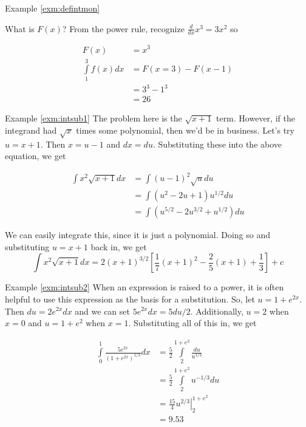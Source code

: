 \documentclass[]{book}
\theoremstyle{definition}
\theoremstyle{definition}
\theoremstyle{definition}
\theoremstyle{remark}
\begin{document}
Example \ref{exm:defintmon}

{}What is \(F(x)\)? From the power rule, recognize \(\frac{d}{dx}x^3 = 3x^2\) so

\begin{align*}
F(x) &= x^3\\
\int\limits_1^3 f(x) dx &= F(x = 3) - F(x  - 1)\\
&= 3^3 - 1^3\\
&=26
\end{align*}

Example \ref{exm:intsub1}
{}The problem here is the \(\sqrt{x+1}\) term. However, if the integrand had \(\sqrt{x}\) times some polynomial, then we'd be in business. Let's try \(u=x+1\). Then \(x=u-1\) and \(dx=du\). Substituting these into the above equation, we get

\begin{align*}
            \int x^2\sqrt{x+1}dx&= \int (u-1)^2\sqrt{u}du\\
            &= \int (u^2-2u+1)u^{1/2}du\\
            &= \int (u^{5/2}-2u^{3/2}+u^{1/2})du
\end{align*}

We can easily integrate this, since it is just a polynomial. Doing so and substituting \(u=x+1\) back in, we get \[\int x^2\sqrt{x+1}dx=2(x+1)^{3/2}\left[\frac{1}{7}(x+1)^2 -
\frac{2}{5}(x+1)+\frac{1}{3}\right]+c\]

Example \ref{exm:intsub2}
{}When an expression is raised to a power, it is often helpful to use this expression as the basis for a substitution. So, let \(u=1+e^{2x}\). Then \(du=2e^{2x}dx\) and we can set \(5e^{2x}dx=5du/2\). Additionally, \(u=2\) when \(x=0\) and \(u=1+e^2\) when \(x=1\). Substituting all of this in, we get

\begin{align*}
\int\limits_0^1 \frac{5e^{2x}}{(1+e^{2x})^{1/3}}dx
            &= \frac{5}{2}\int\limits_2^{1+e^2}\frac{du}{u^{1/3}}\\
            &= \frac{5}{2}\int\limits_2^{1+e^2} u^{-1/3}du\\
            &= \left. \frac{15}{4} u^{2/3} \right|_2^{1+e^2}\\
            &= 9.53
\end{align*}
\end{document}
